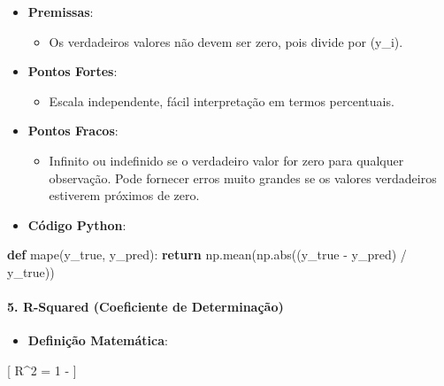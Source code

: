 \documentclass[11pt]{article}
\providecommand{\tightlist}{%
      \setlength{\itemsep}{0pt}\setlength{\parskip}{0pt}}
\newenvironment{Shaded}{}{}
\newcommand{\KeywordTok}[1]{\textcolor[rgb]{0.00,0.44,0.13}{\textbf{{#1}}}}
\newcommand{\NormalTok}[1]{{#1}}
\newcommand{\ControlFlowTok}[1]{\textcolor[rgb]{0.00,0.44,0.13}{\textbf{{#1}}}}
\newcommand{\OperatorTok}[1]{\textcolor[rgb]{0.40,0.40,0.40}{{#1}}}
\newcommand{\BuiltInTok}[1]{{#1}}
\begin{document}
\begin{itemize}
\tightlist
\item
  \textbf{Premissas}:

  \begin{itemize}
  \tightlist
  \item
    Os verdadeiros valores não devem ser zero, pois divide por (y\_i).
  \end{itemize}
\item
  \textbf{Pontos Fortes}:

  \begin{itemize}
  \tightlist
  \item
    Escala independente, fácil interpretação em termos percentuais.
  \end{itemize}
\item
  \textbf{Pontos Fracos}:

  \begin{itemize}
  \tightlist
  \item
    Infinito ou indefinido se o verdadeiro valor for zero para qualquer
    observação. Pode fornecer erros muito grandes se os valores
    verdadeiros estiverem próximos de zero.
  \end{itemize}
\item
  \textbf{Código Python}:
\end{itemize}

\begin{Shaded}
\begin{Highlighting}[]
\KeywordTok{def}\NormalTok{ mape(y\_true, y\_pred):}
    \ControlFlowTok{return}\NormalTok{ np.mean(np.}\BuiltInTok{abs}\NormalTok{((y\_true }\OperatorTok{{-}}\NormalTok{ y\_pred) }\OperatorTok{/}\NormalTok{ y\_true))}
\end{Highlighting}
\end{Shaded}

\hypertarget{r-squared-coeficiente-de-determinauxe7uxe3o}{%
\paragraph{5. R-Squared (Coeficiente de
Determinação)}\label{r-squared-coeficiente-de-determinauxe7uxe3o}}

\begin{itemize}
\tightlist
\item
  \textbf{Definição Matemática}:
\end{itemize}

{[} R\^{}2 = 1 -
{]}
\end{document}
